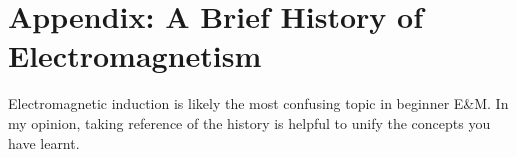 \documentclass[class=article, crop=false, 12pt]{standalone}
\begin{document}
\theend

\newpage
\appendix
\section*{Appendix: A Brief History of Electromagnetism}

Electromagnetic induction is likely the most confusing topic in beginner E\&M.
In my opinion, taking reference of the history is helpful to unify the concepts you have learnt.

\begin{center}
    \begin{tabularx}{\textwidth}{
        >{\centering\arraybackslash}m{} 
        p{}
        }


\end{tabularx}
\end{center}
\end{document}
